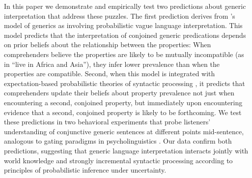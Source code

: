 \documentclass[10pt,letterpaper]{article}
\begin{document}
In this paper we demonstrate and empirically test two predictions about generic interpretation that address these puzzles.  The first prediction derives from 's model of generics as involving probabilistic  vague language interpretation.  This model predicts that the interpretation of conjoined generic predications depends on prior beliefs about the relationship between the properties:  When comprehenders believe the properties are likely to be mutually incompatible (as in ``live in Africa and Asia''), they infer lower prevalence than when the properties are compatible.  Second, when this model is integrated with expectation-based probabilistic theories of syntactic processing \cite{hale:2001,Levy2008}, it predicts that comprehenders update their beliefs about property prevalence not just when encountering a second, conjoined property, but immediately upon encountering evidence that a second, conjoined property is likely to be forthcoming.  We test these predictions in two behavioral experiments that probe listeners' understanding of conjunctive generic sentences at different points mid-sentence, analogous to gating paradigms in psycholinguistics \cite{Grosjean1980}.  Our data confirm both predictions, suggesting that generic language interpretation interacts jointly with world knowledge and strongly incremental syntactic processing according to principles of probabilistic inference under uncertainty.
 
\end{document}

